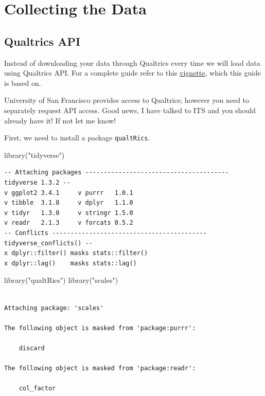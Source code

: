 \documentclass[
  letterpaper,
]{book}
\newenvironment{Shaded}{\begin{snugshade}}{\end{snugshade}}
\newcommand{\FunctionTok}[1]{\textcolor[rgb]{0.28,0.35,0.67}{#1}}
\newcommand{\NormalTok}[1]{\textcolor[rgb]{0.00,0.23,0.31}{#1}}
\newcommand{\StringTok}[1]{\textcolor[rgb]{0.13,0.47,0.30}{#1}}
\begin{document}
\part{Collecting the Data}

\hypertarget{qualtrics-api}{%
\chapter{Qualtrics API}\label{qualtrics-api}}

Instead of downloading your data through Qualtrics every time we will
load data using Qualtrics API. For a complete guide refer to this
\href{https://cran.r-project.org/web/packages/qualtRics/vignettes/qualtRics.html}{vignette},
which this guide is based on.

University of San Francisco provides access to Qualtrics; however you
need to separately request API access. Good news, I have talked to ITS
and you should already have it! If not let me know!

First, we need to install a package \texttt{qualtRics}.

\begin{Shaded}
\begin{Highlighting}[]
\FunctionTok{library}\NormalTok{(}\StringTok{"tidyverse"}\NormalTok{)}
\end{Highlighting}
\end{Shaded}

\begin{verbatim}
-- Attaching packages --------------------------------------- tidyverse 1.3.2 --
v ggplot2 3.4.1     v purrr   1.0.1
v tibble  3.1.8     v dplyr   1.1.0
v tidyr   1.3.0     v stringr 1.5.0
v readr   2.1.3     v forcats 0.5.2
-- Conflicts ------------------------------------------ tidyverse_conflicts() --
x dplyr::filter() masks stats::filter()
x dplyr::lag()    masks stats::lag()
\end{verbatim}

\begin{Shaded}
\begin{Highlighting}[]
\FunctionTok{library}\NormalTok{(}\StringTok{"qualtRics"}\NormalTok{)}
\FunctionTok{library}\NormalTok{(}\StringTok{"scales"}\NormalTok{)}
\end{Highlighting}
\end{Shaded}

\begin{verbatim}

Attaching package: 'scales'

The following object is masked from 'package:purrr':

    discard

The following object is masked from 'package:readr':

    col_factor
\end{verbatim}
\end{document}
